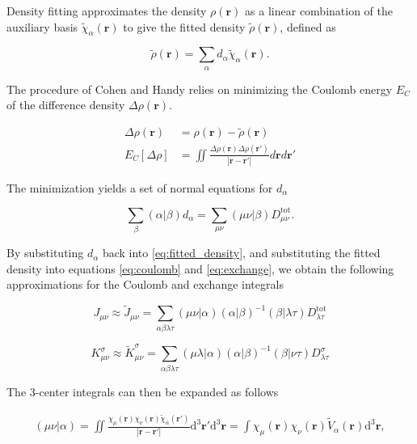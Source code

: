 \documentclass{article}
\begin{document}
Density fitting approximates the density $\rho(\mathbf r)$ as a
linear combination of the auxiliary basis $\tilde \chi_\alpha(\mathbf
r)$ to give the fitted density $\tilde \rho(\mathbf r)$, defined as

\begin{equation}
  \tilde \rho(\mathbf r) =
  \sum_{\alpha}d_{\alpha}\tilde\chi_\alpha(\mathbf r).
  \label{eq:fitted_density}
\end{equation}

The procedure of Cohen and Handy relies on minimizing the Coulomb
energy $E_C$ of the difference density $\Delta\rho(\mathbf r)$.

\begin{align}
  \Delta \rho (\mathbf r) &= \rho(\mathbf r) - \tilde\rho(\mathbf r) \\
  E_C[\Delta \rho] &= \iint \frac{\Delta\rho(\mathbf
  r)\Delta\rho(\mathbf r ')}{|\mathbf r - \mathbf r '|} d
  \mathbf r d \mathbf r '
\end{align}

The minimization yields a set of normal equations for $d_\alpha$

\begin{equation}
  \sum_\beta (\alpha|\beta) d_\alpha =  \sum_{\mu \nu}
  (\mu \nu |\beta)D^{\text{tot}}_{\mu \nu}.
\end{equation}

By substituting $d_\alpha$ back into \eqref{eq:fitted_density}, and
substituting the fitted density into equations \eqref{eq:coulomb} and
\eqref{eq:exchange}, we obtain the following approximations for the
Coulomb and exchange integrals

\begin{equation}
  J_{\mu\nu} \approx \tilde J_{\mu\nu} = \sum_{\alpha \beta \lambda\tau}
  (\mu \nu | \alpha)(\alpha |
  \beta)^{-1}(\beta|\lambda\tau)D^{\text{tot}}_{\lambda\tau}
  \label{eq:coulomb-RI}
\end{equation}

\begin{equation}
  K_{\mu\nu}^\sigma \approx \tilde K_{\mu\nu}^\sigma = \sum_{\alpha
  \beta\lambda\tau}
  (\mu \lambda | \alpha)(\alpha |
  \beta)^{-1}(\beta|\nu\tau)D^\sigma_{\lambda\tau}
  \label{eq:exchange-RI}
\end{equation}

The 3-center integrals can then be expanded as follows

\begin{align}
  (\mu\nu|\alpha) =
  \iint \frac{\chi_\mu(\mathbf r) \chi_\nu (\mathbf r)
  \tilde\chi_\alpha(\mathbf r')}{|\mathbf r - \mathbf{r}'| }
  \mathrm d^3\mathbf r' \mathrm d^3\mathbf r
  = \int \chi_\mu(\mathbf{r})\chi_\nu(\mathbf{r})
  \tilde{V}_\alpha(\mathbf{r})
  \mathrm d^3\mathbf{r},
  \label{eq:3-center-ri}
\end{align}
\end{document}
